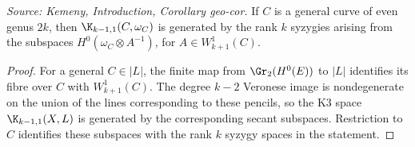 \begin{corollary}
  \label{cor:kemeny_geometric_syzygy_even}
  \textit{Source: Kemeny, Introduction, Corollary geo-cor.}
  If \(C\) is a general curve of even genus \(2k\), then
  \(\K_{k-1,1}(C,\omega_C)\) is generated by the rank \(k\) syzygies arising
  from the subspaces \(H^0(\omega_C\otimes A^{-1})\), for
  \(A\in W^1_{k+1}(C)\).
\end{corollary}
\begin{proof}
  For a general \(C\in |L|\), the finite map from
  \(\Gr_2(H^0(E))\) to \(|L|\) identifies its fibre over \(C\) with
  \(W^1_{k+1}(C)\).  The degree \(k-2\) Veronese image is nondegenerate on the
  union of the lines corresponding to these pencils, so the K3 space
  \(\K_{k-1,1}(X,L)\) is generated by the corresponding secant subspaces.
  Restriction to \(C\) identifies these subspaces with the rank \(k\) syzygy
  spaces in the statement.
\end{proof}

